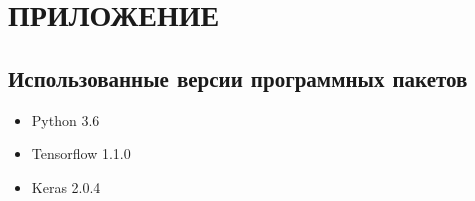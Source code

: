 \section*{\hfil ПРИЛОЖЕНИЕ \hfil}
	\subsection*{Использованные версии программных пакетов}
		\begin{itemize}
			\item Python 3.6
			\item Tensorflow 1.1.0
			\item Keras 2.0.4
		\end{itemize}